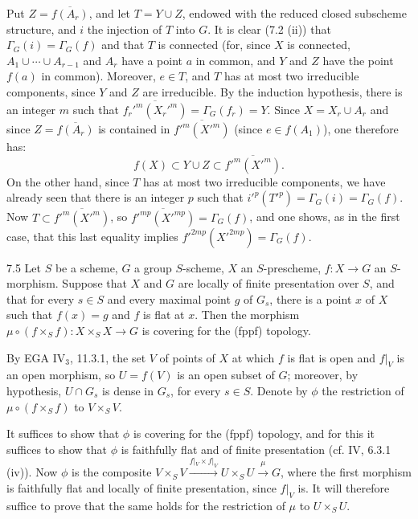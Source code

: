 Put $Z=\overline{f(A_r)}$, and let $T=Y\cup Z$, endowed with the reduced closed subscheme structure, and $i$ the injection of $T$ into $G$. It is clear (7.2 (ii)) that $\Gamma_G(i)=\Gamma_G(f)$ and that $T$ is connected (for, since $X$ is connected, $A_1\cup\cdots\cup A_{r-1}$ and $A_r$ have a point $a$ in common, and $Y$ and $Z$ have the point $f(a)$ in common). Moreover, $e\in T$, and $T$ has at most two irreducible components, since $Y$ and $Z$ are irreducible. By the induction hypothesis, there is an integer $m$ such that $\overline{f_r'^m(X_r'^m)}=\Gamma_G(f_r)=Y$. Since $X=X_r\cup A_r$ and since $Z=\overline{f(A_r)}$ is contained in $\overline{f'^m(X'^m)}$ (since $e\in f(A_1)$), one therefore has:
\[
f(X)\subset Y\cup Z\subset\overline{f'^m(X'^m)}.
\]
On the other hand, since $T$ has at most two irreducible components, we have already seen that there is an integer $p$ such that $i'^p(T'^p)=\Gamma_G(i)=\Gamma_G(f)$. Now $T\subset\overline{f'^m(X'^m)}$, so $\overline{f'^{mp}(X'^{mp})}=\Gamma_G(f)$, and one shows, as in the first case, that this last equality implies $f'^{2mp}(X'^{2mp})=\Gamma_G(f)$.

\begin{lemma}{7.5}\label{VIB.7.5}
Let $S$ be a scheme, $G$ a group $S$-scheme, $X$ an $S$-prescheme, $f:X\to G$ an $S$-morphism. Suppose that $X$ and $G$ are locally of finite presentation over $S$, and that for every $s\in S$ and every maximal point $g$ of $G_s$, there is a point $x$ of $X$ such that $f(x)=g$ and $f$ is flat at $x$. Then the morphism $\mu\circ(f\times_S f):X\times_S X\to G$ is covering for the (fppf) topology.
\end{lemma}
By EGA IV$_3$, 11.3.1, the set $V$ of points of $X$ at which $f$ is flat is open and $f|_V$ is an open morphism, so $U=f(V)$ is an open subset of $G$; moreover, by hypothesis, $U\cap G_s$ is dense in $G_s$, for every $s\in S$. Denote by $\phi$ the restriction of $\mu\circ(f\times_S f)$ to $V\times_S V$.

It suffices to show that $\phi$ is covering for the (fppf) topology, and for this it suffices to show that $\phi$ is faithfully flat and of finite presentation (cf. IV, 6.3.1 (iv)). Now $\phi$ is the composite $V\times_S V\xrightarrow{f|_V\times f|_V}U\times_S U\xrightarrow{\mu}G$, where the first morphism is faithfully flat and locally of finite presentation, since $f|_V$ is. It will therefore suffice to prove that the same holds for the restriction of $\mu$ to $U\times_S U$.


